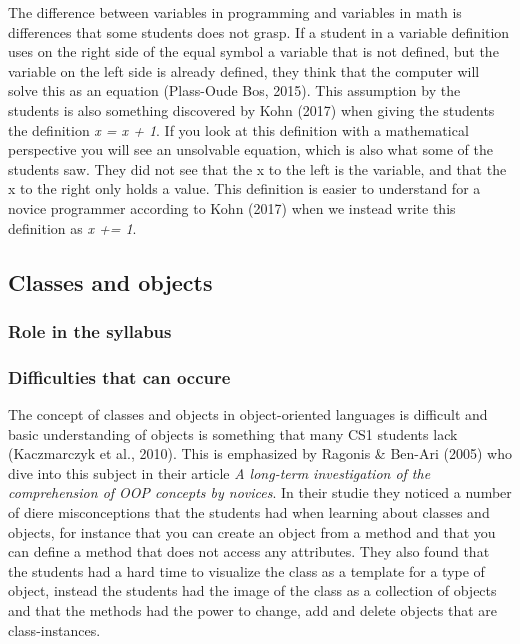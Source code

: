 \documentclass[twocolumn]{article}
\begin{document}
The difference between variables in programming and variables in math is differences that some students does not grasp. If a student in a variable definition uses on the right side of the equal symbol a variable that is not defined, but the variable on the left side is already defined, they think that the computer will solve this as an equation (Plass-Oude Bos, 2015). This assumption by the students is also something discovered by Kohn (2017) when giving the students the definition \emph{x = x + 1}. If you look at this definition with a mathematical perspective you will see an unsolvable equation, which is also what some of the students saw. They did not see that the x to the left is the variable, and that the x to the right only holds a value. This definition is  easier to understand for a novice programmer according to Kohn (2017) when we instead write this definition as \emph{x += 1}. 


\subsection{Classes and objects}

\subsubsection{Role in the syllabus}

\subsubsection{Difficulties that can occure}

The concept of classes and objects in object-oriented languages is difficult and basic understanding of objects is something that many CS1 students lack (Kaczmarczyk et al., 2010). This is emphasized by Ragonis \& Ben-Ari (2005) who dive into this subject in their article \emph{A long-term investigation of the comprehension of OOP concepts by novices}. In their studie they noticed a number of diere misconceptions that the students had when learning about classes and objects, for instance that you can create an object from a method and that you can define a method that does not access any attributes. They also found that the students had a hard time to visualize the class as a template for a type of object, instead the students had the image of the class as a collection of objects and that the methods had the power to change, add and delete objects that are class-instances. 
\end{document}
